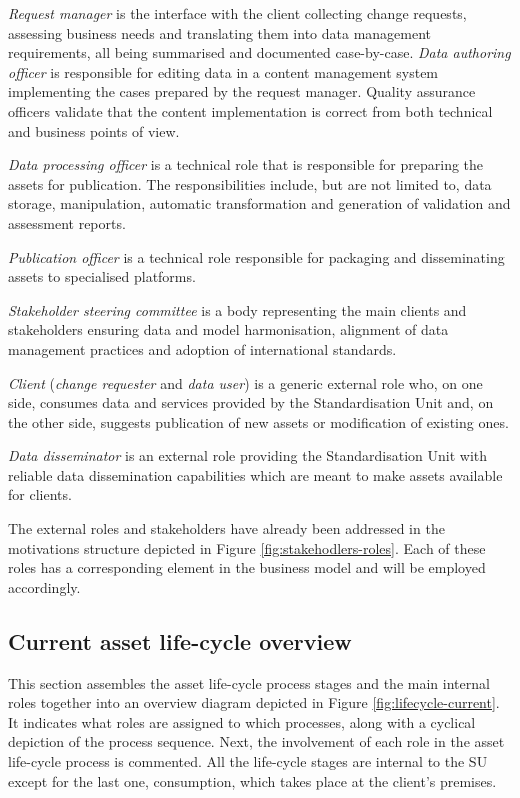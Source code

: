 	\textit{Request manager} is the interface with the client collecting change requests, assessing business needs and translating them into data management requirements, all being summarised and documented case-by-case. 
	\textit{Data authoring officer} is responsible for editing data in a content management system implementing the cases prepared by the request manager.
	Quality assurance officers validate that the content implementation is correct from both technical and business points of view. 
	
	\textit{Data processing officer} is a technical role that is responsible for preparing the assets for publication. The responsibilities include, but are not limited to, data storage, manipulation, automatic transformation and generation of validation and assessment reports. 
	
	\textit{Publication officer} is a technical role responsible for packaging and disseminating assets to specialised platforms.
	
	\textit{Stakeholder steering committee} is a body representing the main clients and stakeholders ensuring data and model harmonisation, alignment of data management practices and adoption of international standards.
	
	\textit{Client} (\textit{change requester} and \textit{data user}) is a generic external role who, on one side, consumes data and services provided by the Standardisation Unit and, on the other side, suggests publication of new assets or modification of existing ones. 
	
	\textit{Data disseminator} is an external role providing the Standardisation Unit with reliable data dissemination capabilities which are meant to make assets available for clients.

	The external roles and stakeholders have already been addressed in the motivations structure depicted in Figure \ref{fig:stakehodlers-roles}. Each of these roles has a corresponding element in the business model and will be employed accordingly.

    
	\subsection{Current asset life-cycle overview}
	\label{sec:lifecycle-current}
	
	This section assembles the asset life-cycle process stages and the main internal roles together into an overview diagram depicted in Figure \ref{fig:lifecycle-current}. It indicates what roles are assigned to which processes, along with a cyclical depiction of the process sequence. Next, the involvement of each role in the asset life-cycle process is commented. All the life-cycle stages are internal to the SU except for the last one, consumption, which takes place at the client's premises.
	
